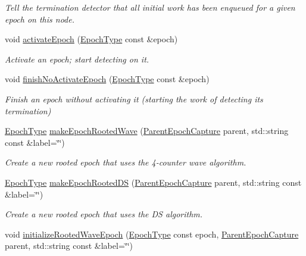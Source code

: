 \begin{DoxyCompactItemize}
\begin{DoxyCompactList}\small\item\em Tell the termination detector that all initial work has been enqueued for a given epoch on this node. \end{DoxyCompactList}\item 
void \hyperlink{structvt_1_1term_1_1_termination_detector_af9f932ff57f12da573a75adbbaee73df}{activate\+Epoch} (\hyperlink{namespacevt_a985a5adf291c34a3ca263b3378388236}{Epoch\+Type} const \&epoch)
\begin{DoxyCompactList}\small\item\em Activate an epoch; start detecting on it. \end{DoxyCompactList}\item 
void \hyperlink{structvt_1_1term_1_1_termination_detector_a349739e9ee6dea98a863b4afb1e49c10}{finish\+No\+Activate\+Epoch} (\hyperlink{namespacevt_a985a5adf291c34a3ca263b3378388236}{Epoch\+Type} const \&epoch)
\begin{DoxyCompactList}\small\item\em Finish an epoch without activating it (starting the work of detecting its termination) \end{DoxyCompactList}\item 
\hyperlink{namespacevt_a985a5adf291c34a3ca263b3378388236}{Epoch\+Type} \hyperlink{structvt_1_1term_1_1_termination_detector_af4e6b3ce62dd3b1f0f0f9f5829e94720}{make\+Epoch\+Rooted\+Wave} (\hyperlink{structvt_1_1term_1_1_parent_epoch_capture}{Parent\+Epoch\+Capture} parent, std\+::string const \&label=\char`\"{}\char`\"{})
\begin{DoxyCompactList}\small\item\em Create a new rooted epoch that uses the 4-\/counter wave algorithm. \end{DoxyCompactList}\item 
\hyperlink{namespacevt_a985a5adf291c34a3ca263b3378388236}{Epoch\+Type} \hyperlink{structvt_1_1term_1_1_termination_detector_ab415e4ad8be8c61f05005fbf60167fdf}{make\+Epoch\+Rooted\+DS} (\hyperlink{structvt_1_1term_1_1_parent_epoch_capture}{Parent\+Epoch\+Capture} parent, std\+::string const \&label=\char`\"{}\char`\"{})
\begin{DoxyCompactList}\small\item\em Create a new rooted epoch that uses the DS algorithm. \end{DoxyCompactList}\item 
void \hyperlink{structvt_1_1term_1_1_termination_detector_a46df4c42ff71d25c5a19cf6a21b9263f}{initialize\+Rooted\+Wave\+Epoch} (\hyperlink{namespacevt_a985a5adf291c34a3ca263b3378388236}{Epoch\+Type} const epoch, \hyperlink{structvt_1_1term_1_1_parent_epoch_capture}{Parent\+Epoch\+Capture} parent, std\+::string const \&label=\char`\"{}\char`\"{})

\end{DoxyCompactItemize}
